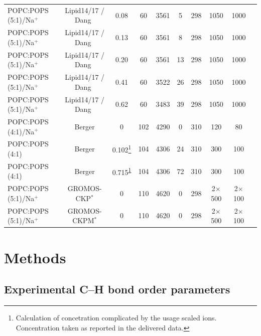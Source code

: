 \documentclass[aps,prl,superscriptaddress,twocolumn]{revtex4}
\begin{document}
\begin{table}[tb]
\begin{tabular}{lccccccccc}
POPC:POPS (5:1)/Na$^{+}$  & Lipid14/17 \cite{dickson14,gould18} / Dang~\cite{smith94,dang06}  & 0.08  & 60  & 3561  & 5  & 298  & 1050  & 1000  & \cite{lipid17_cacl_series} \tabularnewline
POPC:POPS (5:1)/Na$^{+}$  & Lipid14/17 \cite{dickson14,gould18} / Dang~\cite{smith94,dang06}  & 0.13  & 60  & 3561  & 8  & 298  & 1050  & 1000  & \cite{lipid17_cacl_series} \tabularnewline
POPC:POPS (5:1)/Na$^{+}$  & Lipid14/17 \cite{dickson14,gould18} / Dang~\cite{smith94,dang06}  & 0.20  & 60 & 3561  & 13  & 298  & 1050  & 1000  & \cite{lipid17_cacl_series} \tabularnewline
POPC:POPS (5:1)/Na$^{+}$  & Lipid14/17 \cite{dickson14,gould18} / Dang~\cite{smith94,dang06}  & 0.41  & 60 & 3522  & 26  & 298  & 1050  & 1000  & \cite{lipid17_cacl_series} \tabularnewline
POPC:POPS (5:1)/Na$^{+}$  & Lipid14/17 \cite{dickson14,gould18} / Dang~\cite{smith94,dang06}  & 0.62  & 60 & 3483  & 39  & 298  & 1050  & 1000  & \cite{lipid17_cacl_series} \tabularnewline
\hline 
POPC:POPS (4:1)/Na$^{+}$  & Berger \cite{tieleman99,mukhopadhyay04}  & 0  & 102 & 4290  & 0  & 310  & 120  & 80  & \cite{bergerPOPSPOPC4:1mixtureT310K} \tabularnewline
POPC:POPS (4:1)  & Berger \cite{tieleman99,mukhopadhyay04}  & 0.102\footnote{\label{noteBerger}Calculation of concetration complicated by the
usage scaled ions. Concentration taken as reported in the delivered
data.}  & 104  & 4306  & 24  & 310  & 300  & 100  & \cite{POPCpopsBERGERwith102mMCa} \tabularnewline
POPC:POPS (4:1)  & Berger \cite{tieleman99,mukhopadhyay04}  & 0.715\textsuperscript{\ref{noteBerger}}  & 104 & 4306  & 72  & 310  & 300  & 100  & \cite{POPCpopsBERGERwith715mMCa} \tabularnewline
\hline 
POPC:POPS (5:1)/Na$^{+}$  & GROMOS-CKP$^*$ \cite{piggot12}  & 0  & 110 & 4620  & 0  & 298  & 2$\times$500  & 2$\times$100  & \cite{POPCpopsGROMOSCKPwithNa} \tabularnewline
POPC:POPS (5:1)/Na$^{+}$  & GROMOS-CKPM$^*$ \cite{piggot12}  & 0  & 110 & 4620  & 0  & 298  & 2$\times$500  & 2$\times$100  & \cite{POPCpopsGROMOSCKPMwithNa} \tabularnewline
\end{tabular}

\end{table}

\section{Methods}

\subsection{Experimental C--H bond order parameters}%
\end{document}
